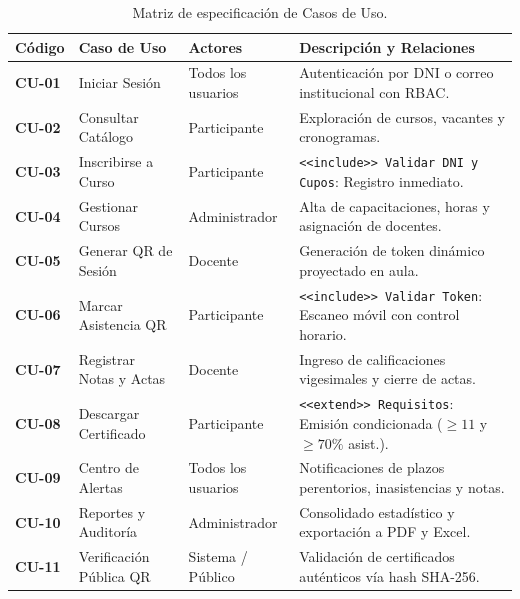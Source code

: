 \begin{table}[H]
\centering
\footnotesize
\begin{tabularx}{\textwidth}{l P{3.8cm} P{3.0cm} Y}
\toprule
\textbf{Código} & \textbf{Caso de Uso} & \textbf{Actores} & \textbf{Descripción y Relaciones} \\
\midrule
\textbf{CU-01} & Iniciar Sesión & Todos los usuarios & Autenticación por DNI o correo institucional con RBAC. \\
\textbf{CU-02} & Consultar Catálogo & Participante & Exploración de cursos, vacantes y cronogramas. \\
\textbf{CU-03} & Inscribirse a Curso & Participante & \texttt{<<include>> Validar DNI y Cupos}: Registro inmediato. \\
\textbf{CU-04} & Gestionar Cursos & Administrador & Alta de capacitaciones, horas y asignación de docentes. \\
\textbf{CU-05} & Generar QR de Sesión & Docente & Generación de token dinámico proyectado en aula. \\
\textbf{CU-06} & Marcar Asistencia QR & Participante & \texttt{<<include>> Validar Token}: Escaneo móvil con control horario. \\
\textbf{CU-07} & Registrar Notas y Actas & Docente & Ingreso de calificaciones vigesimales y cierre de actas. \\
\textbf{CU-08} & Descargar Certificado & Participante & \texttt{<<extend>> Requisitos}: Emisión condicionada ($\ge 11$ y $\ge 70\%$ asist.). \\
\textbf{CU-09} & Centro de Alertas & Todos los usuarios & Notificaciones de plazos perentorios, inasistencias y notas. \\
\textbf{CU-10} & Reportes y Auditoría & Administrador & Consolidado estadístico y exportación a PDF y Excel. \\
\textbf{CU-11} & Verificación Pública QR & Sistema / Público & Validación de certificados auténticos vía hash SHA-256. \\
\bottomrule
\end{tabularx}
\caption{Matriz de especificación de Casos de Uso.}
\label{tab:casos_uso}
\end{table}
